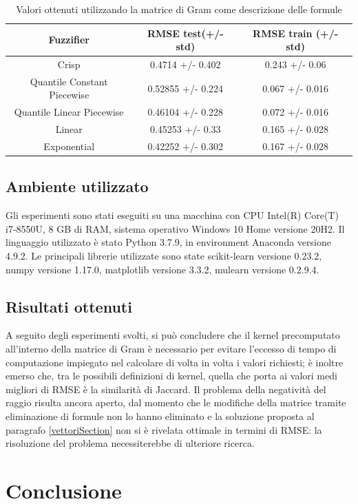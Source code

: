 \documentclass[12pt,a4paper]{report}
\begin{document}
\begin{table}[h!]
\small
\centering 	
	\begin{tabular}{|c|c|c|} 
	 \hline
	  Fuzzifier & RMSE test(+/- std) & RMSE train (+/- std)\\ [0.5ex] 
	 \hline
	 Crisp & 0.4714  +/- 0.402 & 0.243 +/- 0.06 \\ 
	 \hline
	 Quantile Constant Piecewise & 0.52855  +/- 0.224 & 0.067 +/- 0.016\\
	 \hline
	 Quantile Linear Piecewise & 0.46104  +/- 0.228	& 0.072 +/- 0.016\\
	 \hline
	 Linear &0.45253  +/- 0.33 & 0.165 +/- 0.028\\
	 \hline
	 Exponential & 0.42252  +/- 0.302 & 0.167 +/-  0.028\\ [1ex] 
	 \hline
	\end{tabular}
	\caption{Valori ottenuti utilizzando la matrice di Gram come descrizione delle formule}
	\label{table:risultatiVettore}
\end{table}

\section{Ambiente utilizzato}
Gli esperimenti sono stati eseguiti su una macchina con CPU Intel(R) Core(T) i7-8550U, 8 GB di RAM, sistema operativo Windows 10 Home versione 20H2. 
Il linguaggio utilizzato è stato Python 3.7.9, in environment Anaconda \cite{anaconda} versione 4.9.2.
Le principali librerie utilizzate sono state scikit-learn \cite{scikit-learn} versione 0.23.2, numpy \cite{numpy} versione 1.17.0, matplotlib \cite{matplotlib} versione 3.3.2, mulearn \cite{mulearn} versione 0.2.9.4.


\section{Risultati ottenuti}
A seguito degli esperimenti svolti, si può concludere che il kernel precomputato all'interno della matrice di Gram è necessario per evitare l'eccesso di tempo di computazione impiegato nel calcolare di volta in volta i valori richiesti; è inoltre emerso che, tra le possibili definizioni di kernel, quella che porta ai valori medi migliori di RMSE è la similarità di Jaccard.
Il problema della negatività del raggio risulta ancora aperto, dal momento che le modifiche della matrice tramite eliminazione di formule non lo hanno eliminato e la soluzione proposta al paragrafo \ref{vettoriSection} non si è rivelata ottimale in termini di RMSE: la risoluzione del problema necessiterebbe di ulteriore ricerca.

\chapter*{Conclusione}



\end{document}
